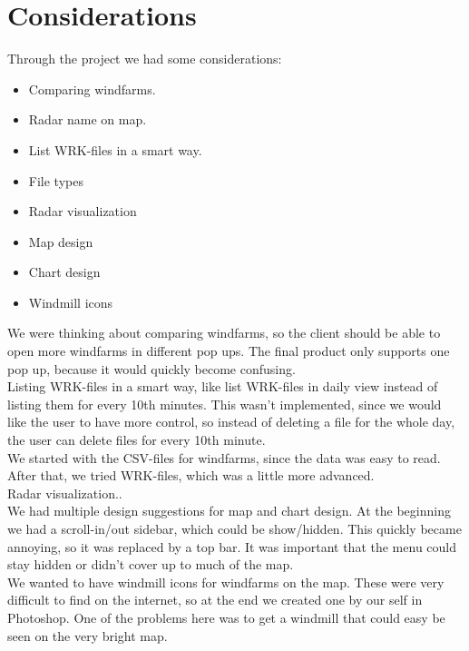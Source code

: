 \chapter{Considerations}
Through the project we had some considerations:
\begin{itemize}
\item Comparing windfarms.
\item Radar name on map.
\item List WRK-files in a smart way.
\item File types
\item Radar visualization
\item Map design
\item Chart design
\item Windmill icons
\end{itemize}
We were thinking about comparing windfarms, so the client should be able to open more windfarms in different pop ups. The final product only supports one pop up, because it would quickly become confusing.\\
Listing WRK-files in a smart way, like list WRK-files in daily view instead of listing them for every 10th minutes. This wasn't implemented, since we would like the user to have more control, so instead of deleting a file for the whole day, the user can delete files for every 10th minute.\\
We started with the CSV-files for windfarms, since the data was easy to read. After that, we tried WRK-files, which was a little more advanced.\\
Radar visualization..\\
We had multiple design suggestions for map and chart design. At the beginning we had a scroll-in/out sidebar, which could be show/hidden. This quickly became annoying, so it was replaced by a top bar. It was important that the menu could stay hidden or didn't cover up to much of the map.\\
We wanted to have windmill icons for windfarms on the map. These were very difficult to find on the internet, so at the end we created one by our self in Photoshop. One of the problems here was to get a windmill that could easy be seen on the very bright map.
